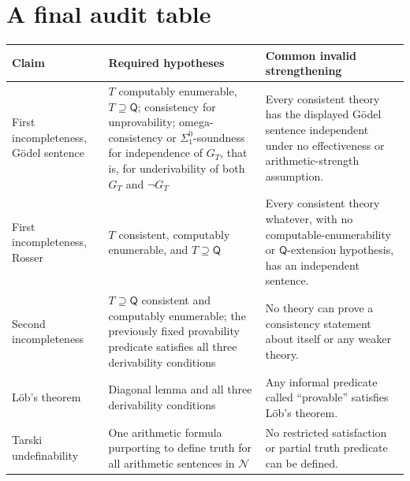 \section{A final audit table}
\label{sec:second-incompleteness-05}

\begin{longtable}{@{}p{}p{}p{}@{}}
\toprule
Claim & Required hypotheses & Common invalid strengthening \\
\midrule
\endhead
First incompleteness, G\"odel sentence & \(T\) computably enumerable,
\(T\supseteq\mathsf Q\); consistency for unprovability; omega-consistency or
\(\Sigma^0_1\)-soundness for independence of \(G_T\), that is, for
underivability of both \(G_T\) and \(\neg G_T\) & Every consistent theory
has the displayed G\"odel sentence independent under no effectiveness or
arithmetic-strength assumption. \\
\addlinespace
First incompleteness, Rosser & \(T\) consistent, computably enumerable, and
\(T\supseteq\mathsf Q\) & Every consistent theory whatever, with no
computable-enumerability or \(\mathsf Q\)-extension hypothesis, has an
independent sentence. \\
\addlinespace
Second incompleteness & \(T\supseteq\mathsf Q\) consistent and computably
enumerable; the previously fixed provability predicate satisfies all three
derivability conditions &
No theory can prove a consistency statement about itself or any weaker theory.
\\
\addlinespace
L\"ob's theorem & Diagonal lemma and all three derivability conditions & Any
informal predicate called ``provable'' satisfies L\"ob's theorem. \\
\addlinespace
Tarski undefinability & One arithmetic formula purporting to define truth for
all arithmetic sentences in \(\mathcal N\) & No restricted satisfaction or
partial truth predicate can be defined. \\
\bottomrule
\end{longtable}

